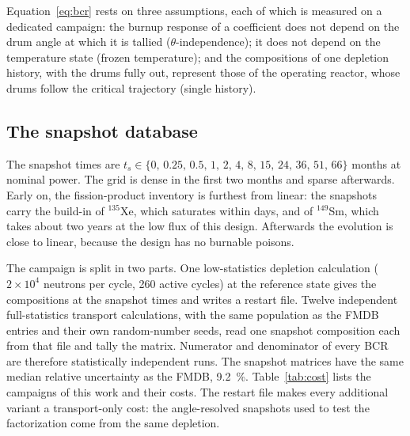 \documentclass[]{ANStopical}
\begin{document}
Equation~\eqref{eq:bcr} rests on three assumptions, each of which is measured on a dedicated campaign: the burnup response of a coefficient does not depend on the drum angle at which it is tallied ($\theta$-independence); it does not depend on the temperature state (frozen temperature); and the compositions of one depletion history, with the drums fully out, represent those of the operating reactor, whose drums follow the critical trajectory (single history).

\subsection{The snapshot database}

The snapshot times are $t_s \in \{0,\,0.25,\,0.5,\,1,\,2,\,4,\,8,\,15,\,24,\,36,\,51,\,66\}$ months at nominal power. The grid is dense in the first two months and sparse afterwards. Early on, the fission-product inventory is furthest from linear: the snapshots carry the build-in of $^{135}$Xe, which saturates within days, and of $^{149}$Sm, which takes about two years at the low flux of this design. Afterwards the evolution is close to linear, because the design has no burnable poisons.

The campaign is split in two parts. One low-statistics depletion calculation ($2\times 10^4$ neutrons per cycle, 260 active cycles) at the reference state gives the compositions at the snapshot times and writes a restart file. Twelve independent full-statistics transport calculations, with the same population as the FMDB entries and their own random-number seeds, read one snapshot composition each from that file and tally the matrix. Numerator and denominator of every BCR are therefore statistically independent runs. The snapshot matrices have the same median relative uncertainty as the FMDB, \SI{9.2}{\percent}. Table~\ref{tab:cost} lists the campaigns of this work and their costs. The restart file makes every additional variant a transport-only cost: the angle-resolved snapshots used to test the factorization come from the same depletion.
\end{document}
